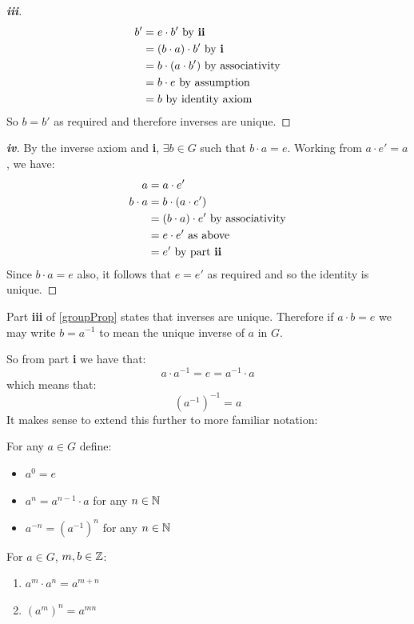 \documentclass[../main.tex]{subfiles}
\begin{document}
\begin{proof}[\textbf{iii}]
  \begin{align*}
    b' &= e \cdot b' \text{ by \textbf{ii}} \\
       &= (b \cdot a) \cdot b' \text{ by \textbf{i}} \\
       &= b \cdot (a \cdot b') \text{ by associativity} \\
       &= b \cdot e \text{ by assumption} \\
       &= b \text{ by identity axiom}
  \end{align*}
  So $b  = b'$ as required and therefore inverses are unique.
\end{proof}
\begin{proof}[\textbf{iv}]
  By the inverse axiom and \textbf{i}, $\exists b \in G$ such that $b \cdot a = e$.
  Working from $a \cdot e' = a$, we have:
  \begin{align*}
    a &= a \cdot e'\\
    b \cdot a &= b \cdot (a \cdot e') \\
              &= (b \cdot a) \cdot e' \text{ by associativity} \\
              &= e \cdot e' \text{ as above} \\
              &= e' \text{ by part \textbf{ii}}
  \end{align*}
  Since $b \cdot a = e$ also, it follows that $e = e'$ as required and so the identity is unique.
\end{proof}
\begin{remark}[Notation]
  Part \textbf{iii} of \cref{groupProp} states that inverses are unique.
  Therefore if $a \cdot b = e$ we may write $b = a^{-1}$ to mean the unique inverse of $a$ in $G$.
\end{remark}
So from part \textbf{i} we have that:
\[
  a \cdot a^{-1} = e = a^{-1} \cdot a
\]
which means that:
\[
  (a^{-1})^{-1} = a
\]
It makes sense to extend this further to more familiar notation:
\begin{remark}[Notation]
  For any $a \in G$ define:
  \begin{itemize}
    \item $a^{0} = e$
    \item $a^{n} = a^{n - 1} \cdot a$ for any $n \in \mathbb{N}$
    \item $a^{-n} = (a^{-1})^{n}$ for any $n \in \mathbb{N}$
  \end{itemize}
\end{remark}
\begin{proposition}
  For $a \in G$, $m, b \in \mathbb{Z}$:
  \begin{enumerate}
    \item $a^{m} \cdot a^{n} = a^{m + n}$
    \item $(a^{m})^{n} = a^{mn}$
  \end{enumerate}
\end{proposition}
\end{document}
